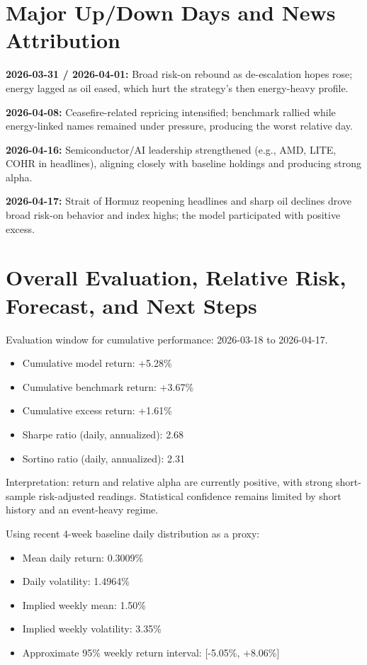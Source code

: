 \documentclass[11pt]{article}
\begin{document}
\section{Major Up/Down Days and News Attribution}
\textbf{2026-03-31 / 2026-04-01:} Broad risk-on rebound as de-escalation hopes rose; energy lagged as oil eased, which hurt the strategy's then energy-heavy profile.

\textbf{2026-04-08:} Ceasefire-related repricing intensified; benchmark rallied while energy-linked names remained under pressure, producing the worst relative day.

\textbf{2026-04-16:} Semiconductor/AI leadership strengthened (e.g., AMD, LITE, COHR in headlines), aligning closely with baseline holdings and producing strong alpha.

\textbf{2026-04-17:} Strait of Hormuz reopening headlines and sharp oil declines drove broad risk-on behavior and index highs; the model participated with positive excess.

\section{Overall Evaluation, Relative Risk, Forecast, and Next Steps}
Evaluation window for cumulative performance: 2026-03-18 to 2026-04-17.

\begin{itemize}
\item Cumulative model return: +5.28\%
\item Cumulative benchmark return: +3.67\%
\item Cumulative excess return: +1.61\%
\item Sharpe ratio (daily, annualized): 2.68
\item Sortino ratio (daily, annualized): 2.31
\end{itemize}

Interpretation: return and relative alpha are currently positive, with strong short-sample risk-adjusted readings. Statistical confidence remains limited by short history and an event-heavy regime.

Using recent 4-week baseline daily distribution as a proxy:
\begin{itemize}
\item Mean daily return: 0.3009\%
\item Daily volatility: 1.4964\%
\item Implied weekly mean: 1.50\%
\item Implied weekly volatility: 3.35\%
\item Approximate 95\% weekly return interval: [-5.05\%, +8.06\%]
\end{itemize}
\end{document}
